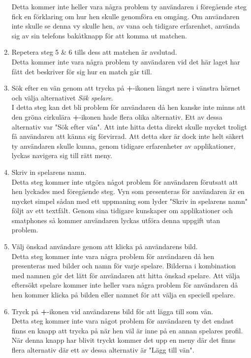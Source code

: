 \documentclass[a4paper, 11pt]{article}
\begin{document}
\begin{enumerate}
Detta kommer inte heller vara några problem ty användaren i föregående steg fick en förklaring om hur hen skulle genomföra en omgång. Om användaren inte skulle se denna vy skulle hen, av vana och tidigare erfarenhet, använda sig av sin telefons bakåtknapp för att komma ut matchen.
\item Repetera steg 5 \& 6 tills dess att matchen är avslutad.\\
Detta kommer inte vara några problem ty användaren vid det här laget har fått det beskriver för sig hur en match går till.
\item Sök efter en vän genom att trycka på \textbf{+}-ikonen längst nere i vänstra hörnet och välja alternativet \textit{Sök spelare}.\\
I detta steg kan det bli problem för användaren då hen kanske inte minns att den gröna cirkulära \textbf{+}-ikonen hade flera olika alternativ. Ett av dessa alternativ var "Sök efter vän". Att inte hitta detta direkt skulle mycket troligt få användaren att känna sig förvirrad. Att detta sker är dock inte helt säkert ty användaren skulle kunna, genom tidigare erfarenheter av applikationer, lyckas navigera sig till rätt meny.
\item Skriv in spelarens namn.\\
Detta steg kommer inte utgöra något problem för användaren förutsatt att hen lyckades med föregående steg. Vyn som presenteras för användaren är en mycket simpel sådan med ett uppmaning som lyder "Skriv in spelarens namn" följt av ett textfält. Genom sina tidigare kunskaper om applikationer och smatphones så kommer användaren lyckas utföra denna uppgift utan problem.
\item Välj önskad användare genom att klicka på användarens bild.\\
Detta steg kommer inte vara några problem för användaren då hen presenteras med bilder och namn för varje spelare. Bilderna i kombination med namnen gör det lätt för användaren att hitta önskad spelare. Att välja eftersökt spelare kommer inte heller vara några problem för användaren då hen kommer klicka på bilden eller namnet för att välja en speciell spelare.
\item Tryck på \textbf{+}-ikonen vid användarens bild för att lägga till som vän.\\
Detta steg kommer inte vara något problem för användaren ty det endast finns en knapp att trycka på när hen väl är inne på en annan spelares profil. När denna knapp har blivit tryckt kommer det upp en meny där det finns flera alternativ där ett av dessa alternativ är "Lägg till vän". 

\end{enumerate}
\end{document}
